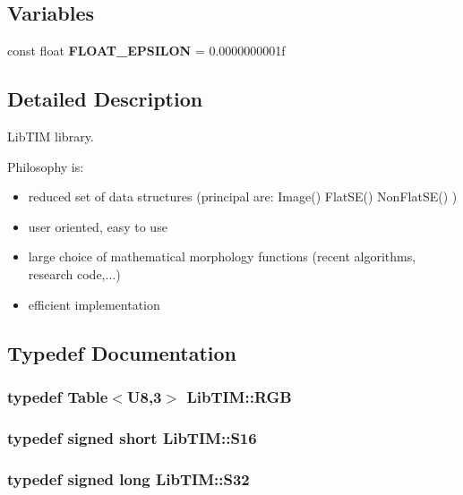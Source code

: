 \subsection*{Variables}
\begin{CompactItemize}
\item 
const float {\bf FLOAT\_\-EPSILON} = 0.0000000001f
\end{CompactItemize}


\subsection{Detailed Description}
Lib\-TIM library. 

Philosophy is: \begin{itemize}
\item reduced set of data structures (principal are: Image() Flat\-SE() Non\-Flat\-SE() ) \item user oriented, easy to use \item large choice of mathematical morphology functions (recent algorithms, research code,...) \item efficient implementation\end{itemize}




\subsection{Typedef Documentation}
\subsubsection{\setlength{\rightskip}{0pt plus 5cm}typedef {\bf Table}$<${\bf U8},3$>$ {\bf Lib\-TIM::RGB}}\label{namespaceLibTIM_a8}


\subsubsection{\setlength{\rightskip}{0pt plus 5cm}typedef signed short {\bf Lib\-TIM::S16}}\label{namespaceLibTIM_a5}


\subsubsection{\setlength{\rightskip}{0pt plus 5cm}typedef signed long {\bf Lib\-TIM::S32}}\label{namespaceLibTIM_a7}


